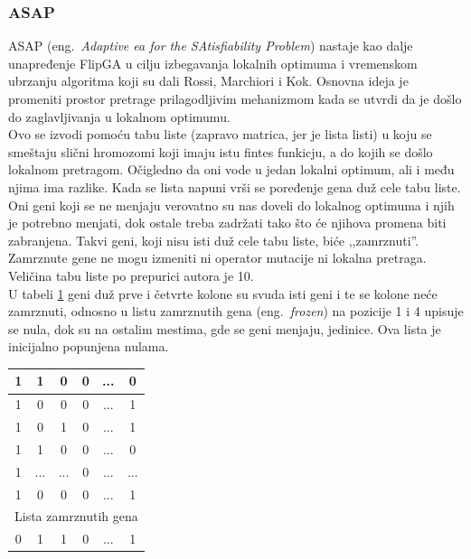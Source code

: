 \documentclass[a4paper]{article}
\begin{document}
\subsubsection{ASAP}
\label{sec:ea_asap}
ASAP (eng.~{\em Adaptive ea for the SAtisfi­ability Problem}) \cite{adaptiveEA, ea_with_table} nastaje kao dalje unapređenje FlipGA u cilju izbegavanja lokalnih optimuma
i vremenskom ubrzanju algoritma koji su dali Rossi, Marchiori i Kok. 
Osnovna ideja je promeniti prostor pretrage prilagodljivim mehanizmom 
kada se utvrdi da je došlo do zaglavljivanja u lokalnom optimumu. \\

Ovo se izvodi pomoću tabu liste (zapravo matrica, jer je lista listi) 
u koju se smeštaju slični hromozomi koji imaju
istu fintes funkicju, a do kojih se došlo lokalnom pretragom. Očigledno da oni vode u
jedan lokalni optimum, ali i među njima ima razlike. Kada se lista napuni vrši se poređenje
gena duž cele tabu liste.
Oni geni koji se ne menjaju verovatno su nas doveli do lokalnog optimuma 
i njih je potrebno menjati, dok ostale treba
zadržati tako što će njihova promena biti zabranjena. Takvi geni, koji nisu isti duž cele
tabu liste, biće ,,zamrznuti''. Zamrznute gene ne mogu izmeniti ni operator mutacije
ni lokalna pretraga. Veličina tabu liste po prepurici autora je 10.\\

U tabeli \ref{tab:ea_tabu_list} geni duž prve i četvrte kolone su svuda isti geni i te
se kolone neće zamrznuti, odnosno u listu zamrznutih gena (eng.~{\em frozen}) na pozicije 1 i 4 upisuje se
nula, dok su na ostalim mestima, gde se geni menjaju, jedinice. 
Ova lista je inicijalno popunjena nulama.

\begin{table}[h!]
\centering
{}\label{tab:ea_tabu_list} 
\begin{tabular}{|*{6}{c|}}
 \hline
  1 & 1 & 0 & 0 & ... & 0 \\ \hline
  1 & 0 & 0 & 0 & ... & 1 \\ \hline
  1 & 0 & 1 & 0 & ... & 1 \\ \hline
  1 & 1 & 0 & 0 & ... & 0 \\ \hline
  1 & ... & ... & 0 & ... & ... \\ \hline
  1 & 0 & 0 & 0 & ... & 1 \\ \hline \hline
  \multicolumn{6}{|c|}{Lista zamrznutih gena} \\ \hline
  0 & 1 & 1 & 0 & ... & 1 \\ \hline
\end{tabular}
\end{table}
\end{document}
